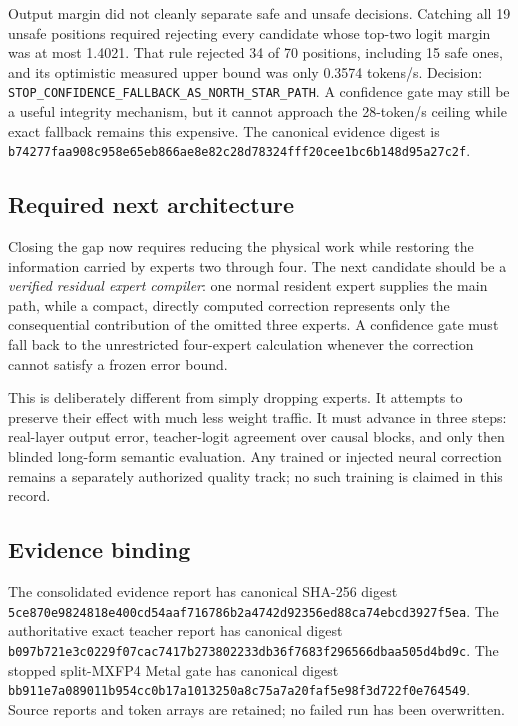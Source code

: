 Output margin did not cleanly separate safe and unsafe decisions.  Catching
all 19 unsafe positions required rejecting every candidate whose top-two logit
margin was at most 1.4021.  That rule rejected 34 of 70 positions, including 15
safe ones, and its optimistic measured upper bound was only 0.3574 tokens/s.
Decision: \texttt{STOP\_CONFIDENCE\_FALLBACK\_AS\_NORTH\_STAR\_PATH}.  A
confidence gate may still be a useful integrity mechanism, but it cannot
approach the 28-token/s ceiling while exact fallback remains this expensive.
The canonical evidence digest is
\texttt{b74277faa908c958e65eb866ae8e82c28d78324fff20cee1bc6b148d95a27c2f}.

\subsection{Required next architecture}

Closing the gap now requires reducing the physical work while restoring the
information carried by experts two through four.  The next candidate should be
a \emph{verified residual expert compiler}: one normal resident expert supplies
the main path, while a compact, directly computed correction represents only
the consequential contribution of the omitted three experts.  A confidence
gate must fall back to the unrestricted four-expert calculation whenever the
correction cannot satisfy a frozen error bound.

This is deliberately different from simply dropping experts.  It attempts to
preserve their effect with much less weight traffic.  It must advance in three
steps: real-layer output error, teacher-logit agreement over causal blocks, and
only then blinded long-form semantic evaluation.  Any trained or injected
neural correction remains a separately authorized quality track; no such
training is claimed in this record.

\subsection{Evidence binding}

The consolidated evidence report has canonical SHA-256 digest
\texttt{5ce870e9824818e400cd54aaf716786b2a4742d92356ed88ca74ebcd3927f5ea}.
The authoritative exact teacher report has canonical digest
\texttt{b097b721e3c0229f07cac7417b273802233db36f7683f296566dbaa505d4bd9c}.
The stopped split-MXFP4 Metal gate has canonical digest
\texttt{bb911e7a089011b954cc0b17a1013250a8c75a7a20faf5e98f3d722f0e764549}.
Source reports and token arrays are retained; no failed run has been overwritten.

